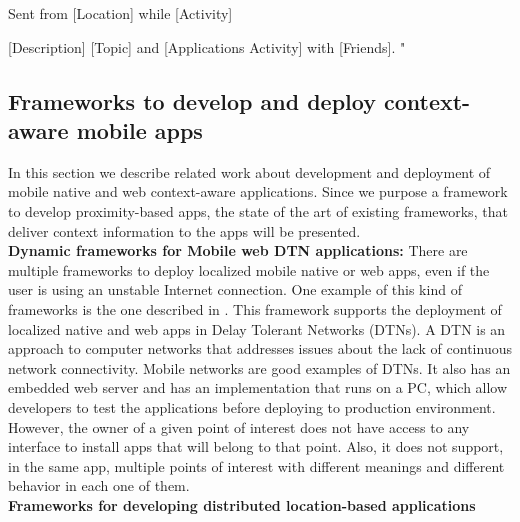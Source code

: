 Sent from [Location] while [Activity]

[Description] [Topic] and [Applications Activity] with 
[Friends].
"
\\
\subsection{Frameworks to develop and deploy 
context-aware mobile apps}
\label{sub:frameworks_context_aware}
In this section we describe related work about
development and deployment of mobile native and web 
context-aware applications.
Since we purpose a framework to develop
proximity-based apps, the state
of the art of existing frameworks, that deliver
context information to the apps will be presented.
\\
\textbf{Dynamic frameworks for Mobile web DTN applications:}
There are multiple frameworks to deploy localized
mobile native or web apps, even if the user is using an
unstable Internet connection. One example of this
kind of frameworks is the one
described in \cite{Sankaran2014}.
This framework supports the deployment of localized 
native and
web apps in Delay Tolerant Networks (DTNs).
A DTN is an approach to computer networks that 
addresses issues about the lack of continuous network
connectivity. Mobile networks are good examples of DTNs. 
It also has an embedded web server 
and has an implementation that runs on a PC, which allow
developers to test the applications before deploying
to production environment.
However, the owner of a given point of interest does not
have access to any interface to install apps that will
belong to that point. Also, it does not support, in the
same app, multiple points of interest with different
meanings and different behavior in each one of them.
\\
\textbf{Frameworks for developing distributed
location-based applications}

